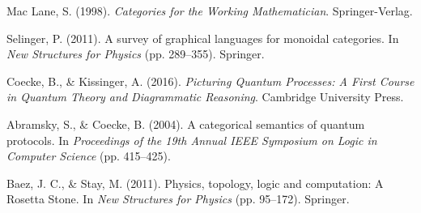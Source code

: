 \documentclass[11pt]{article}
\begin{document}
\begin{thebibliography}{9}

Mac Lane, S. (1998).
\textit{Categories for the Working Mathematician}.
Springer-Verlag.

Selinger, P. (2011).
A survey of graphical languages for monoidal categories.
In \textit{New Structures for Physics} (pp. 289--355). Springer.

Coecke, B., \& Kissinger, A. (2016).
\textit{Picturing Quantum Processes: A First Course in Quantum Theory and Diagrammatic Reasoning}.
Cambridge University Press.

Abramsky, S., \& Coecke, B. (2004).
A categorical semantics of quantum protocols.
In \textit{Proceedings of the 19th Annual IEEE Symposium on Logic in Computer Science} (pp. 415--425).

Baez, J. C., \& Stay, M. (2011).
Physics, topology, logic and computation: A Rosetta Stone.
In \textit{New Structures for Physics} (pp. 95--172). Springer.
  
\end{thebibliography}
\end{document}
